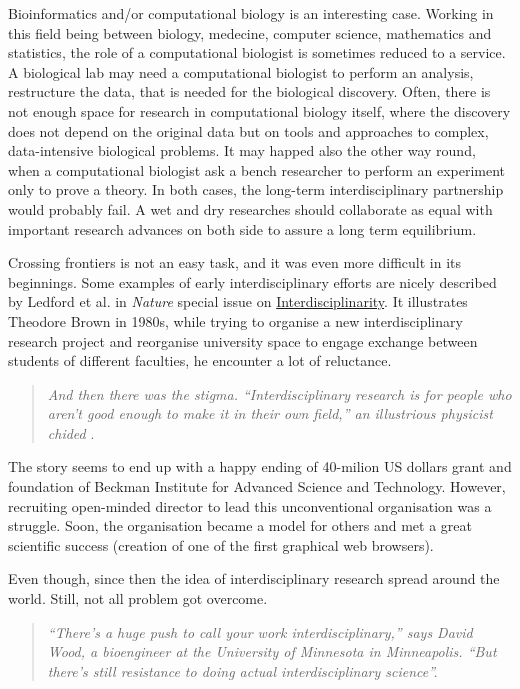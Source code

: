 \documentclass[12pt,]{book}
\theoremstyle{definition}
\theoremstyle{definition}
\theoremstyle{definition}
\theoremstyle{remark}
\begin{document}
Bioinformatics and/or computational biology is an interesting case.
Working in this field being between biology, medecine, computer science,
mathematics and statistics, the role of a computational biologist is
sometimes reduced to a service. A biological lab may need a
computational biologist to perform an analysis, restructure the data,
that is needed for the biological discovery. Often, there is not enough
space for research in computational biology itself, where the discovery
does not depend on the original data but on tools and approaches to
complex, data-intensive biological problems. It may happed also the
other way round, when a computational biologist ask a bench researcher
to perform an experiment only to prove a theory. In both cases, the
long-term interdisciplinary partnership would probably fail. A wet and
dry researches should collaborate as equal with important research
advances on both side to assure a long term equilibrium.

Crossing frontiers is not an easy task, and it was even more difficult
in its beginnings. Some examples of early interdisciplinary efforts are
nicely described by Ledford et al. \citep{Ledford2015} in \emph{Nature}
special issue on
\href{https://www.nature.com/news/interdisciplinarity-1.18295}{Interdisciplinarity}.
It illustrates Theodore Brown in 1980s, while trying to organise a new
interdisciplinary research project and reorganise university space to
engage exchange between students of different faculties, he encounter a
lot of reluctance.

\begin{quote}
\emph{And then there was the stigma. ``Interdisciplinary research is for
people who aren't good enough to make it in their own field,'' an
illustrious physicist chided} \citep{Ledford2015}.
\end{quote}

The story seems to end up with a happy ending of 40-milion US dollars
grant and foundation of Beckman Institute for Advanced Science and
Technology. However, recruiting open-minded director to lead this
unconventional organisation was a struggle. Soon, the organisation
became a model for others and met a great scientific success (creation
of one of the first graphical web browsers).

Even though, since then the idea of interdisciplinary research spread
around the world. Still, not all problem got overcome.

\begin{quote}
\emph{``There's a huge push to call your work interdisciplinary,'' says
David Wood, a bioengineer at the University of Minnesota in Minneapolis.
``But there's still resistance to doing actual interdisciplinary
science''.}
\end{quote}
\end{document}
